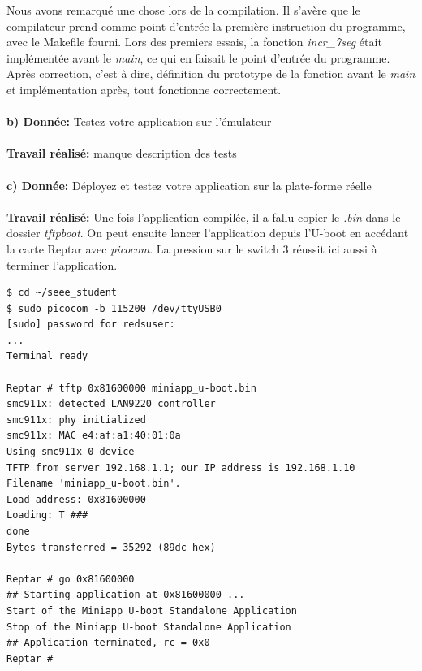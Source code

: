 Nous avons remarqué une chose lors de la compilation. Il s'avère que le compilateur prend comme point d'entrée la première instruction du programme, avec le Makefile fourni. Lors des premiers essais, la fonction \textit{incr\_7seg} était implémentée avant le \textit{main}, ce qui en faisait le point d'entrée du programme. Après correction, c'est à dire, définition du prototype de la fonction avant le \textit{main} et implémentation après, tout fonctionne correctement.\\\\
\textbf{b) Donnée: }Testez votre application sur l’émulateur\\\\
\textbf{\color{red} Travail réalisé: }manque description des tests\color{black}\\\\
\textbf{c) Donnée: }Déployez et testez votre application sur la plate-forme réelle\\\\
\textbf{Travail réalisé: }Une fois l'application compilée, il a fallu copier le \textit{.bin} dans le dossier \textit{tftpboot}. On peut ensuite lancer l'application depuis l'U-boot en accédant la carte Reptar avec \textit{picocom}. La pression sur le switch 3 réussit ici aussi à terminer l'application.
\begin{lstlisting}
$ cd ~/seee_student
$ sudo picocom -b 115200 /dev/ttyUSB0
[sudo] password for redsuser: 
...
Terminal ready

Reptar # tftp 0x81600000 miniapp_u-boot.bin
smc911x: detected LAN9220 controller
smc911x: phy initialized
smc911x: MAC e4:af:a1:40:01:0a
Using smc911x-0 device
TFTP from server 192.168.1.1; our IP address is 192.168.1.10
Filename 'miniapp_u-boot.bin'.
Load address: 0x81600000
Loading: T ###
done
Bytes transferred = 35292 (89dc hex)

Reptar # go 0x81600000
## Starting application at 0x81600000 ...
Start of the Miniapp U-boot Standalone Application
Stop of the Miniapp U-boot Standalone Application
## Application terminated, rc = 0x0
Reptar # 
\end{lstlisting}

